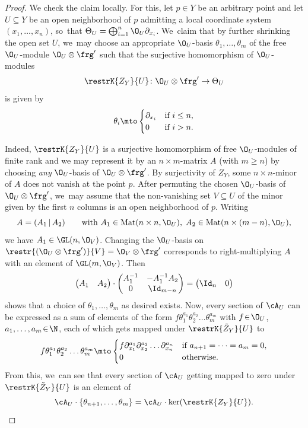 \begin{proof}
We check the claim locally. For this, let $p \in Y$ be an arbitrary point and let $U \subseteq Y$ be an open neighborhood of $p$ admitting a local coordinate system $(x_1,\dots,x_n)$, so~that $\Theta_U = \bigoplus_{i=1}^n \O_U \partial_{x_i}$. We~claim that by further shrinking the open set $U$, we~may choose
an appropriate $\O_U$-basis $\theta_1,\dots,\theta_m$ of the free $\O_U$\nobreakdash-mod\-ule $\O_U \otimes \frg'$ such that the surjective homomorphism of $\O_U$\nobreakdash-mod\-ules
\[
\restrK{Z_Y}{U} \colon \O_U \otimes \frg' \to \Theta_U
\]
is given by
\[
\theta_i \mto 
\begin{cases} \partial_{x_i} &\text{if } i \leq n, \\ 0 &\text{if } i > n. \end{cases}
\]

Indeed, $\restrK{Z_Y}{U}$ is a surjective homomorphism of free $\O_U$\nobreakdash-mod\-ules of finite rank and we may represent it by an $n \times m$-matrix $A$ (with $m \geq n$) by choosing \emph{any} $\O_U$\nobreakdash-basis of $\O_U \otimes \frg'$. By surjectivity of $Z_Y$, some $n \times n$-minor of $A$ does not vanish at the point $p$. After permuting the chosen $\O_U$-basis of $\O_U \otimes \frg'$, we~may assume that the non-vanishing set $V \subseteq U$ of the minor given by the first $n$ columns is an open neighborhood of $p$. Writing\vspace*{-3pt}
\[
A = (A_1 \, | \, A_2) \qquad \text{with } A_1 \in \operatorname{Mat}(n\times n,\O_U),\; A_2 \in \operatorname{Mat}(n\times (m-n),\O_U),
\]
we have $A_1 \in \GL(n,\O_V)$. Changing the $\O_U$-basis on $\restr{(\O_U \otimes \frg')}{V} = \O_V \otimes \frg'$ corresponds to right-multiplying $A$ with an element of $\GL(m,\O_V)$. Then
\[
\begin{pmatrix}
A_1 & A_2
\end{pmatrix} \cdot
\begin{pmatrix}
\arraycolsep3.5pt
A_1^{-1} & -A_1^{-1}A_2 \\
0 & \Id_{m-n}
\end{pmatrix} =
\begin{pmatrix}
\Id_n & 0
\end{pmatrix}
\]
shows that a choice of $\theta_1,\dots, \theta_m$ as desired exists.
Now, every section of $\cA_U$ can be expressed as a sum of elements of the form $f \theta_1^{a_1} \theta_2^{a_2} \dots \theta_m^{a_m}$ with $f \!\in\! \O_U$, \hbox{$a_1,\dots,a_m \!\in\! \N$}, each of which gets mapped under $\restrK{\tilde{Z}_Y}{U}$ to\vspace*{-3pt}
\[
f \theta_1^{a_1} \theta_2^{a_2} \dots \theta_m^{a_m} \mto 
\begin{cases}
f \partial_{x_1}^{a_1} \partial_{x_2}^{a_2} \dots \partial_{x_n}^{a_n} &\text{if } a_{n+1} = \dots = a_m = 0, \\
0 &\text{otherwise.}
\end{cases}
\]
From this, we~can see that every section of $\cA_U$ getting mapped to zero under $\restrK{\tilde{Z}_Y}{U}$ is an element of\vspace*{-3pt}
\[
\cA_U \cdot \{\theta_{n+1},\dots,\theta_m\} = \cA_U \cdot \ker(\restrK{Z_Y}{U}). \qedhere
\]
\end{proof}

